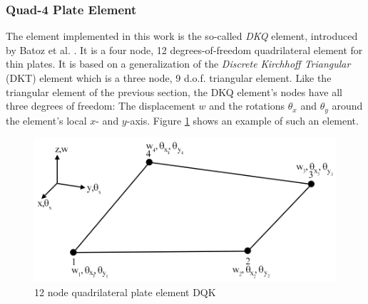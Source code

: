   \subsubsection{Quad-4 Plate Element}\label{sec:Shell-Plate-Quad}
  The element implemented in this work is the so-called \textit{DKQ} element, introduced by Batoz et al. \cite{batoz1982evaluation}. It is a four node, 12 degrees-of-freedom quadrilateral element for thin plates. It is based on a generalization of the \textit{Discrete Kirchhoff Triangular} (DKT) element which is a three node, 9 d.o.f. triangular element. Like the triangular element of the previous section, the DKQ element's nodes have all three degrees of freedom: The displacement $w$ and the rotations $\theta_x$ and $\theta_y$ around the element's local $x$- and $y$-axis. Figure \ref{fig:dkq} shows an example of such an element.
  \begin{figure}[htbp] %
  	\centering
  	\includegraphics[width=0.97\linewidth]{figures/dkq}
  	\caption{12 node quadrilateral plate element DQK}
  	\label{fig:dkq}
  \end{figure}

